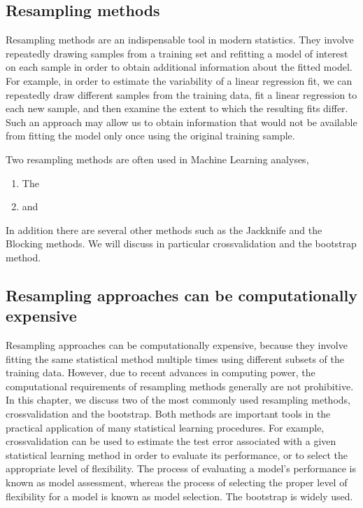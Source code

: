\documentclass[letterpaper,10pt,english]{sphinxmanual}
\begin{document}
\subsection{Resampling methods}
\label{\detokenize{chapter4:resampling-methods}}
Resampling methods are an indispensable tool in modern
statistics. They involve repeatedly drawing samples from a training
set and refitting a model of interest on each sample in order to
obtain additional information about the fitted model. For example, in
order to estimate the variability of a linear regression fit, we can
repeatedly draw different samples from the training data, fit a linear
regression to each new sample, and then examine the extent to which
the resulting fits differ. Such an approach may allow us to obtain
information that would not be available from fitting the model only
once using the original training sample.

Two resampling methods are often used in Machine Learning analyses,
\begin{enumerate}
%
\item {} 
The 

\item {} 
and 

\end{enumerate}

In addition there are several other methods such as the Jackknife and the Blocking methods. We will discuss in particular
cross\sphinxhyphen{}validation and the bootstrap method.


\subsection{Resampling approaches can be computationally expensive}
\label{\detokenize{chapter4:resampling-approaches-can-be-computationally-expensive}}
Resampling approaches can be computationally expensive, because they
involve fitting the same statistical method multiple times using
different subsets of the training data. However, due to recent
advances in computing power, the computational requirements of
resampling methods generally are not prohibitive. In this chapter, we
discuss two of the most commonly used resampling methods,
cross\sphinxhyphen{}validation and the bootstrap. Both methods are important tools
in the practical application of many statistical learning
procedures. For example, cross\sphinxhyphen{}validation can be used to estimate the
test error associated with a given statistical learning method in
order to evaluate its performance, or to select the appropriate level
of flexibility. The process of evaluating a model’s performance is
known as model assessment, whereas the process of selecting the proper
level of flexibility for a model is known as model selection. The
bootstrap is widely used.
\end{document}

